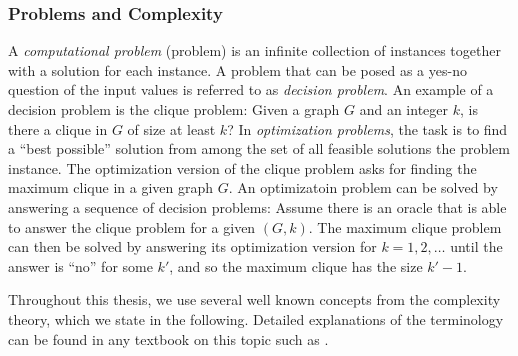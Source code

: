 \subsubsection{Problems and Complexity}\label{sect:probcomp}

A \emph{computational problem} (problem) is an infinite collection of instances together with a solution for each instance.
A problem that can be posed as a yes-no question of the input values is referred to as \emph{decision problem}.
An example of a decision problem is the clique problem: Given a graph $G$ and an integer $k$, is there a clique in $G$ of size at least $k$?
In \emph{optimization problems}, the task is to find a ``best possible'' solution from among the set of all feasible solutions the problem instance.
The optimization version of the clique problem asks for finding the maximum clique in a given graph $G$.
An optimizatoin problem can be solved by answering a sequence of decision problems:
Assume there is an oracle that is able to answer the clique problem for a given $(G,k)$.
The maximum clique problem can then be solved by answering its optimization version for $k=1,2,\dots$ until the answer is ``no'' for some $k'$, and so the maximum clique has the size $k'-1$.

Throughout this thesis, we use several well known concepts from the complexity theory, which we state in the following.
Detailed explanations of the terminology can be found in any textbook on this topic such as \cite{sipser06}.

